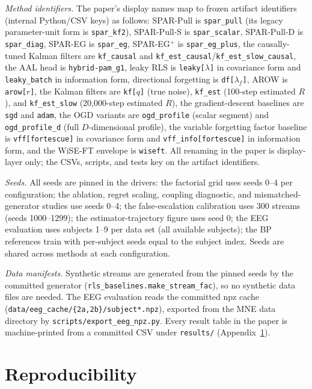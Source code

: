 \documentclass[11pt]{article}
\begin{document}
\emph{Method identifiers.}
The paper's display names map to frozen artifact identifiers (internal Python/CSV keys) as follows: SPAR-Pull is \texttt{spar\_pull} (its legacy parameter-unit form is \texttt{spar\_kf2}), SPAR-Pull-S is \texttt{spar\_scalar}, SPAR-Pull-D is \texttt{spar\_diag}, SPAR-EG is \texttt{spar\_eg}, SPAR-EG$^+$ is \texttt{spar\_eg\_plus}, the causally-tuned Kalman filters are \texttt{kf\_causal} and \texttt{kf\_est\_causal}/\texttt{kf\_est\_slow\_causal}, the AAL head is \texttt{hybrid-pam\_g1}, leaky RLS is \texttt{leaky[$\lambda$]} in covariance form and \texttt{leaky\_batch} in information form, directional forgetting is \texttt{df[$\lambda_f$]}, AROW is \texttt{arow[$r$]}, the Kalman filters are \texttt{kf[$q$]} (true noise), \texttt{kf\_est} (100-step estimated $R$), and \texttt{kf\_est\_slow} (20{,}000-step estimated $R$), the gradient-descent baselines are \texttt{sgd} and \texttt{adam}, the OGD variants are \texttt{ogd\_profile} (scalar segment) and \texttt{ogd\_profile\_d} (full $D$-dimensional profile), the variable forgetting factor baseline is \texttt{vff[fortescue]} in covariance form and \texttt{vff\_info[fortescue]} in information form, and the WiSE-FT envelope is \texttt{wiseft}.
All renaming in the paper is display-layer only; the CSVs, scripts, and tests key on the artifact identifiers.

\emph{Seeds.}
All seeds are pinned in the drivers: the factorial grid uses seeds 0--4 per configuration; the ablation, regret scaling, coupling diagnostic, and mismatched-generator studies use seeds 0--4; the false-escalation calibration uses 300 streams (seeds 1000--1299); the estimator-trajectory figure uses seed 0; the EEG evaluation uses subjects 1--9 per data set (all available subjects); the BP references train with per-subject seeds equal to the subject index.
Seeds are shared across methods at each configuration.

\emph{Data manifests.}
Synthetic streams are generated from the pinned seeds by the committed generator (\texttt{rls\_baselines.make\_stream\_fac}), so no synthetic data files are needed.
The EEG evaluation reads the committed npz cache (\texttt{data/eeg\_cache/\{2a,2b\}/subject*.npz}), exported from the MNE data directory by \texttt{scripts/export\_eeg\_npz.py}.
Every result table in the paper is machine-printed from a committed CSV under \texttt{results/} (Appendix~\ref{app:repro}).

\section{Reproducibility}
\label{app:repro}
\end{document}

